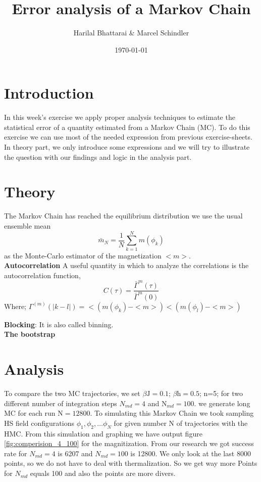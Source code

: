 \documentclass[11pt, a4paper, DIV=12]{scrartcl}
\title{Error analysis of a Markov Chain}
\date{\today}
\author{Harilal Bhattarai \& Marcel Schindler}
\begin{document}
	\maketitle
	
\section{Introduction}
In this week’s exercise we apply proper analysis techniques to estimate the statistical error of a quantity estimated from a Markov Chain (MC). To do this exercise we can use most of the needed expression from previous exercise-sheets. In theory part, we only introduce some expressions and  we will try to illustrate the question with our findings and logic in the analysis part.
\section{Theory}
	The Markov Chain has reached the equilibrium distribution we use the usual ensemble mean
	\begin{equation}
	\bar{m}_{N}= \frac{1}{N}\sum_{k=1}^{N} m(\phi_{k})
	\end{equation}
	as the Monte-Carlo estimator of the magnetization $ <m> $.\\
	
	\textbf{Autocorrelation}
	A useful quantity in which to analyze the correlations is the autocorrelation function,
	\begin{equation}
	C(\tau)= \frac{\bar{\Gamma}^{m}(\tau)}{\bar{\Gamma}^{m}(0)}
	\end{equation}
	Where; 
	$  
	\Gamma^{(m)}(|k -l|)= <(m(\phi_{k}) - <m>) <(m(\phi_{l}) - <m>) $
	
	\textbf{Blocking}: It is also called binning.\\
	\textbf{The bootstrap}
	
\section{Analysis}
To compare the two MC trajectories, we set $\beta \text{J}= 0.1 $; $\beta \text{h}= 0.5 $; n=5; for two different number of integration steps $ N_{md}=4$ and  $\text{N}_{md}= 100 $. we generate long MC for each run $ \text{N}=12800 $. To simulating this Markov Chain we took sampling HS field configurations $ \phi_{1}, \phi_{2}, \dots \phi_{N} $ for given number N of trajectories with the HMC. From this simulation and graphing we have output figure \ref{fig:comperision_4_100} for the magnitization. From our research we got success rate for $ N_{md}=4$ is 6207 and $ N_{md}=100 $ is 12800. We only look at the last 8000 points, so we do not have to deal with thermalization. So we get way more Points for $N_{md}$ equals 100 and also the points are more divers.
	
\end{document}
